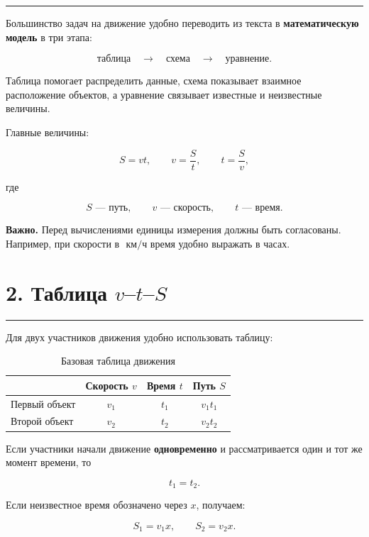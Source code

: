 \documentclass[a4paper,12pt]{article}
\newcommand{\kmh}{\text{ км/ч}}
\newcommand{\sectionline}{
    \vspace{-0.2em}
    {\color{linegray}\rule{\linewidth}{0.5pt}}
    \vspace{0.5em}
}
\newcommand{\key}[1]{\textcolor{darkaccent}{\textbf{#1}}}
\begin{document}
\sectionline

Большинство задач на движение удобно переводить из текста в
\key{математическую модель} в три этапа:

\[
\boxed{\text{таблица}}
\quad\longrightarrow\quad
\boxed{\text{схема}}
\quad\longrightarrow\quad
\boxed{\text{уравнение}}.
\]

Таблица помогает распределить данные, схема показывает взаимное
расположение объектов, а уравнение связывает известные и неизвестные
величины.

Главные величины:

\[
\boxed{S=vt},
\qquad
\boxed{v=\frac{S}{t}},
\qquad
\boxed{t=\frac{S}{v}},
\]

где

\[
S\text{ --- путь},\qquad
v\text{ --- скорость},\qquad
t\text{ --- время}.
\]

\textbf{Важно.}
Перед вычислениями единицы измерения должны быть согласованы.
Например, при скорости в \(\kmh\) время удобно выражать в часах.


\section*{\textcolor{darkaccent}{2. Таблица \(v\)--\(t\)--\(S\)}}

\sectionline

Для двух участников движения удобно использовать таблицу:

\begin{table}[h!]
\centering
\caption{Базовая таблица движения}
\renewcommand{\arraystretch}{1.35}
\begin{tabularx}{0.88\linewidth}{Xccc}
\toprule
& \textbf{Скорость \(v\)} & \textbf{Время \(t\)} & \textbf{Путь \(S\)}\\
\midrule
Первый объект  & \(v_1\) & \(t_1\) & \(v_1t_1\)\\
Второй объект  & \(v_2\) & \(t_2\) & \(v_2t_2\)\\
\bottomrule
\end{tabularx}
\end{table}

Если участники начали движение \key{одновременно} и рассматривается один
и тот же момент времени, то

\[
t_1=t_2.
\]

Если неизвестное время обозначено через \(x\), получаем:

\[
S_1=v_1x,
\qquad
S_2=v_2x.
\]
\end{document}
